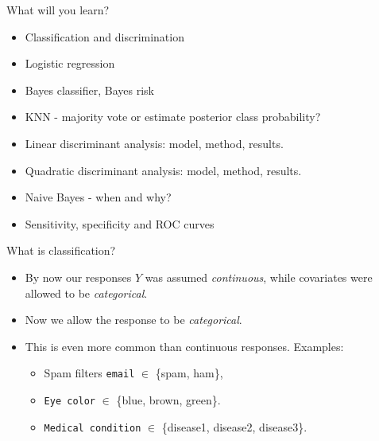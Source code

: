 \documentclass[10pt,ignorenonframetext,]{beamer}
\providecommand{\tightlist}{%
  \setlength{\itemsep}{0pt}\setlength{\parskip}{0pt}}
\begin{document}
\begin{frame}

\begin{block}{What will you learn?}

\begin{itemize}
\item
  Classification and discrimination
\item
  Logistic regression
\item
  Bayes classifier, Bayes risk
\item
  KNN - majority vote or estimate posterior class probability?
\item
  Linear discriminant analysis: model, method, results.
\item
  Quadratic discriminant analysis: model, method, results.
\item
  Naive Bayes - when and why?
\item
  Sensitivity, specificity and ROC curves
\end{itemize}

\end{block}

\end{frame}

\begin{frame}[fragile]{What is classification?}

\vspace{3mm}

\begin{itemize}
\item
  By now our responses \(Y\) was assumed \emph{continuous}, while
  covariates were allowed to be \emph{categorical}. \vspace{1mm}
\item
  Now we allow the response to be \emph{categorical}. \vspace{1mm}
\item
  This is even more common than continuous responses. Examples:

  \begin{itemize}
  \tightlist
  \item
    Spam filters \texttt{email} \(\in\) \{spam, ham\},
  \item
    \texttt{Eye\ color} \(\in\) \{blue, brown, green\}.
  \item
    \texttt{Medical\ condition} \(\in\) \{disease1, disease2,
    disease3\}.
  \end{itemize}
\end{itemize}

\end{frame}
\end{document}
